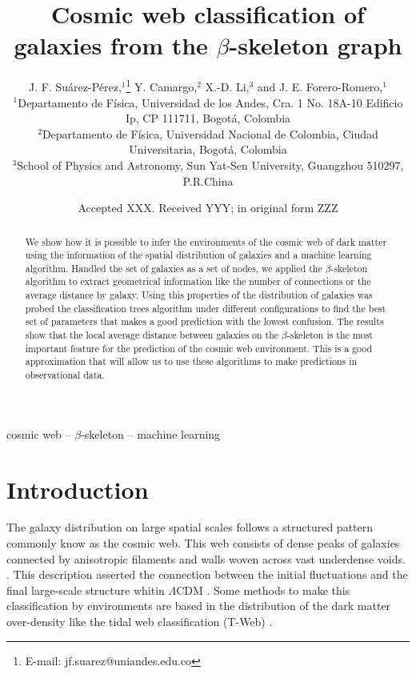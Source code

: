 \documentclass[usenatbib]{mnras}
\title[The $\beta$-skeleton and the T-web]{Cosmic web classification of galaxies from the $\beta$-skeleton graph}
\author[J. F. Su\'arez-P\'erez et al.]{
J. F. Su\'arez-P\'erez,$^{1}$\thanks{E-mail: jf.suarez@uniandes.edu.co}
Y. Camargo,$^{2}$ 
X.-D. Li,$^{3}$
and J. E. Forero-Romero,$^{1}$
\\
$^{1}$Departamento de F\'isica, Universidad de los Andes, Cra. 1 No. 18A-10 Edificio Ip, CP 111711, Bogot\'a, Colombia\\
$^{2}$Departamento de F\'isica, Universidad Nacional de Colombia, Ciudad Universitaria, Bogot\'a, Colombia\\
$^{3}$School of Physics and Astronomy, Sun Yat-Sen University, Guangzhou 510297, P.R.China\\
}
\date{Accepted XXX. Received YYY; in original form ZZZ}
\begin{document}
\label{firstpage}
\pagerange{\pageref{firstpage}--\pageref{lastpage}}
\maketitle

\begin{abstract}
We show how it is possible to infer the environments of the cosmic web
of dark matter using the information of the spatial distribution of
galaxies and a machine learning algorithm. 
Handled the set of galaxies
as a set of nodes, we applied the $\beta$-skeleton algorithm to
extract geometrical information like the number of connections or the
average distance by galaxy. 
Using this properties of the distribution
of galaxies was probed the classification trees algorithm under
different configurations to find the best set of parameters that makes
a good prediction with the lowest confusion. 
The results show that the
local average distance between galaxies on the $\beta$-skeleton is the
most important feature for the prediction of the cosmic web
environment. 
This is a good approximation that will allow us to use
these algorithms to make predictions in observational data. 
\end{abstract}

\begin{keywords}
cosmic web -- $\beta$-skeleton -- machine learning
\end{keywords}


\section{Introduction}

The galaxy distribution on large spatial scales follows a structured 
pattern commonly know as the cosmic web. 
This web consists of dense peaks of galaxies connected by
anisotropic filaments and walls woven across vast underdense voids. 
\citep{1996Bond}. 
This description asserted the connection between the initial
fluctuations and the final large-scale structure whitin $\Lambda$CDM
\citep{1987White}. 
Some methods to make this classification by environments are based in
the distribution of the dark matter over-density like the tidal web
classification (T-Web) \cite{2007Hahn,2009Forero-Romero}. 
\end{document}
